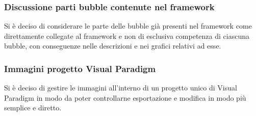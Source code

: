 \subsubsection{Discussione parti bubble contenute nel framework}
Si è deciso di considerare le parte delle bubble già presenti nel framework come direttamente collegate al framework e non di esclusiva competenza di ciascuna bubble, con conseguenze nelle descrizioni e nei grafici relativi ad esse.

\subsubsection{Immagini progetto Visual Paradigm}
Si è deciso di gestire le immagini all'interno di un progetto unico di Visual Paradigm in modo da poter controllarne esportazione e modifica in modo più semplice e diretto.

\clearpage
